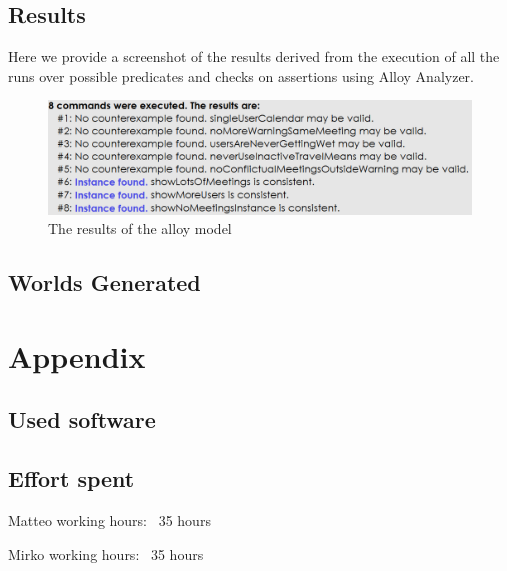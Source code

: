 \documentclass{article}
\begin{document}
\texttt{}	

\clearpage
\subsection{Results}
\begin{center}
Here we provide a screenshot of the results derived from the execution of all the runs over possible predicates and checks on assertions using Alloy Analyzer.
	\begin{figure}[htp] 

\includegraphics[width=\textwidth]{alloy/material/alloyresults} 
\caption{The results of the alloy model} 
\label{fig:alloyresults} 
\end{figure} 
\end{center}
\clearpage
\subsection{Worlds Generated}

\clearpage
\section{Appendix}

\subsection{Used software}


\subsection{Effort spent}

\item Matteo working hours: ~35 hours

\item Mirko working hours: ~35 hours
\end{document}
